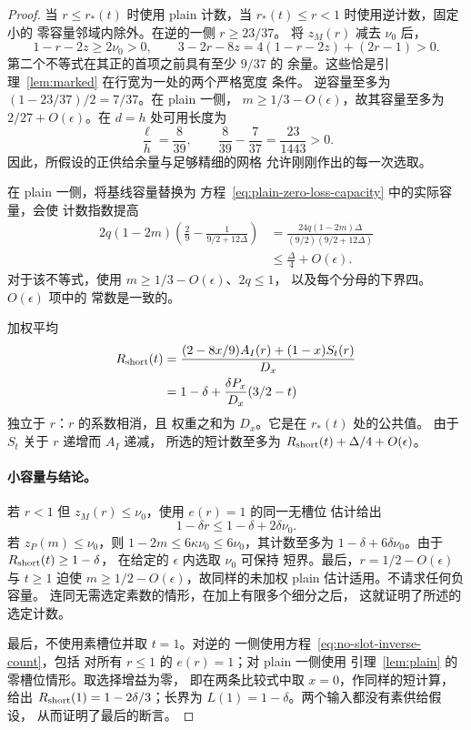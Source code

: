 \documentclass[11pt,a4paper]{article}
\numberwithin{equation}{section}
\numberwithin{figure}{section}
\theoremstyle{definition}
\theoremstyle{remark}
\begin{document}
\begin{proof}
当 \(r\le r_*(t)\) 时使用 plain 计数，当
\(r_*(t)\le r<1\) 时使用逆计数，固定小的
零容量邻域内除外。在逆的一侧 \(r\ge23/37\)。
将 \(z_M(r)\) 减去 \(\nu_0\) 后，
\[
 1-r-2z\ge2\nu_0>0,\qquad
 3-2r-8z=4(1-r-2z)+(2r-1)>0.
\]
第二个不等式在其正的首项之前具有至少 \(9/37\) 的
余量。这些恰是引理~\ref{lem:marked} 在行宽为一处的两个严格宽度
条件。
逆容量至多为
\((1-23/37)/2=7/37\)。在 plain 一侧，
\(m\ge1/3-O(\epsilon)\)，故其容量至多为
\(2/27+O(\epsilon)\)。在 \(d=h\) 处可用长度为
\[
 \frac{\ell}{h}=\frac8{39},\qquad
 \frac8{39}-\frac7{37}=\frac{23}{1443}>0.
\]
因此，所假设的正供给余量与足够精细的网格
允许刚刚作出的每一次选取。

在 plain 一侧，将基线容量替换为
方程~\eqref{eq:plain-zero-loss-capacity} 中的实际容量，会使
计数指数提高
\begin{equation}
 \begin{split}
 2q(1-2m)
 \left(\frac29-\frac1{9/2+12\Delta}\right)
 &=\frac{24q(1-2m)\Delta}{(9/2)(9/2+12\Delta)}\\
 &\le\frac{\Delta}{4}+O(\epsilon).
 \end{split}
 \label{eq:capacity-comparison}
\end{equation}
对于该不等式，使用 \(m\ge1/3-O(\epsilon)\)、\(2q\le1\)，
以及每个分母的下界四。\(O(\epsilon)\) 项中的
常数是一致的。

加权平均
\begin{equation}
 \begin{aligned}
 R_{\rm short}(t)
 &=\frac{(2-8x/9)A_I(r)+(1-x)S_t(r)}{D_x}\\
 &=1-\delta+\frac{\delta P_x}{D_x}(3/2-t)
 \end{aligned}
 \label{eq:short-crossing-count}
\end{equation}
独立于 \(r\)：\(r\) 的系数相消，且
权重之和为 \(D_x\)。它是在 \(r_*(t)\) 处的公共值。
由于 \(S_t\) 关于 \(r\) 递增而 \(A_I\) 递减，
所选的短计数至多为 \(R_{\rm short}(t)+\Delta/4+O(\epsilon)\)。

\paragraph{小容量与结论。}
若 \(r<1\) 但 \(z_M(r)\le\nu_0\)，使用 \(e(r)=1\) 的同一无槽位
估计给出
\[
 1-\delta r\le1-\delta+2\delta\nu_0.
\]
若 \(z_P(m)\le\nu_0\)，则
\(1-2m\le6\kappa\nu_0\le6\nu_0\)，其计数至多为
\(1-\delta+6\delta\nu_0\)。由于 \(R_{\rm short}(t)\ge1-\delta\)，
在给定的 \(\epsilon\) 内选取 \(\nu_0\) 可保持
短界。最后，\(r=1/2-O(\epsilon)\) 与 \(t\ge1\)
迫使 \(m\ge1/2-O(\epsilon)\)，故同样的未加权 plain
估计适用。不请求任何负容量。
连同无需选定素数的情形，在加上有限多个细分之后，
这就证明了所述的选定计数。

最后，不使用素槽位并取 \(t=1\)。对逆的
一侧使用方程~\eqref{eq:no-slot-inverse-count}，包括
对所有 \(r\le1\) 的 \(e(r)=1\)；对 plain 一侧使用
引理~\ref{lem:plain} 的零槽位情形。取选择增益为零，
即在两条比较式中取 \(x=0\)，作同样的短计算，
给出 \(R_{\rm short}(1)=1-2\delta/3\)；长界为
\(L(1)=1-\delta\)。两个输入都没有素供给假设，
从而证明了最后的断言。
\end{proof}
\end{document}
